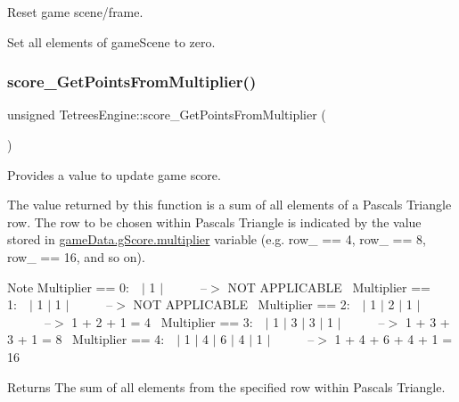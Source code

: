 Reset game scene/frame. 

Set all elements of game\+Scene to zero. \mbox{\label{classTetreesEngine_a848fc0ff4003f3c4d74c11efdc91f0cb}} 
\subsubsection{\texorpdfstring{score\+\_\+\+Get\+Points\+From\+Multiplier()}{score\_GetPointsFromMultiplier()}}
{\footnotesize\ttfamily unsigned Tetrees\+Engine\+::score\+\_\+\+Get\+Points\+From\+Multiplier (\begin{DoxyParamCaption}{ }\end{DoxyParamCaption})\hspace{0.3cm}{\ttfamily [private]}}



Provides a value to update game score. 

The value returned by this function is a sum of all elements of a Pascal\textquotesingle{}s Triangle row. The row to be chosen within Pascal\textquotesingle{}s Triangle is indicated by the value stored in \hyperlink{structgame__score__t}{game\+Data.g\+Score.multiplier} variable (e.\+g. row\+\_ == 4, row\+\_ == 8, row\+\_ == 16, and so on). \begin{DoxyNote}{Note}
Multiplier == 0\+:~~$\vert$ 1 $\vert$~~~~~~--$>$ N\+OT A\+P\+P\+L\+I\+C\+A\+B\+LE~\newline
 Multiplier == 1\+:~~$\vert$ 1 $\vert$ 1 $\vert$~~~~~~--$>$ N\+OT A\+P\+P\+L\+I\+C\+A\+B\+LE~\newline
 Multiplier == 2\+:~~$\vert$ 1 $\vert$ 2 $\vert$ 1 $\vert$~~~~~~--$>$ 1 + 2 + 1 = 4~\newline
 Multiplier == 3\+:~~$\vert$ 1 $\vert$ 3 $\vert$ 3 $\vert$ 1 $\vert$~~~~~~--$>$ 1 + 3 + 3 + 1 = 8~\newline
 Multiplier == 4\+:~~$\vert$ 1 $\vert$ 4 $\vert$ 6 $\vert$ 4 $\vert$ 1 $\vert$~~~~~~--$>$ 1 + 4 + 6 + 4 + 1 = 16~\newline

\end{DoxyNote}
\begin{DoxyReturn}{Returns}
The sum of all elements from the specified row within Pascal\textquotesingle{}s Triangle. 
\end{DoxyReturn}
\mbox{\label{classTetreesEngine_ad379bf5d98a182411d4d91b12b6ef5ba}} 
